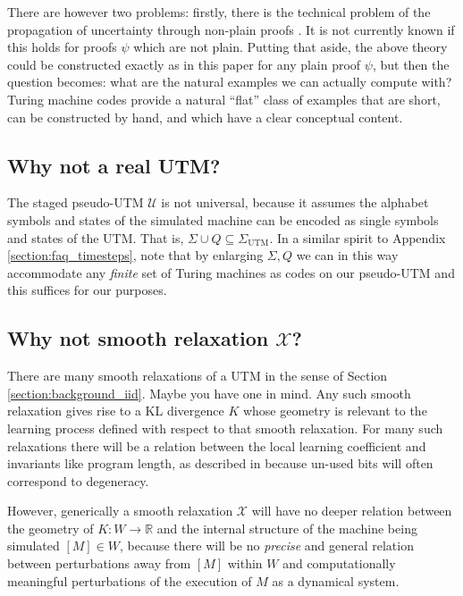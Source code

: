 \documentclass[english,letter paper,12pt,reqno]{article}
\theoremstyle{definition}
\newcommand{\lto}{\longrightarrow}
\begin{document}
There are however two problems: firstly, there is the technical problem of the propagation of uncertainty through non-plain proofs \cite{clift2020encodings}. It is not currently known if this holds for proofs $\psi$ which are not plain. Putting that aside, the above theory could be constructed exactly as in this paper for any plain proof $\psi$, but then the question becomes: what are the natural examples we can actually compute with? Turing machine codes provide a natural ``flat'' class of examples that are short, can be constructed by hand, and which have a clear conceptual content.

\subsection{Why not a real UTM?}\label{section:faq_realutm}

The staged pseudo-UTM $\mathcal{U}$ is not universal, because it assumes the alphabet symbols and states of the simulated machine can be encoded as single symbols and states of the UTM. That is, $\Sigma \cup Q \subseteq \Sigma_{\text{UTM}}$. In a similar spirit to Appendix \ref{section:faq_timesteps}, note that by enlarging $\Sigma, Q$ we can in this way accommodate any \emph{finite} set of Turing machines as codes on our pseudo-UTM and this suffices for our purposes.

\subsection{Why not smooth relaxation $\mathcal{X}$?}

There are many smooth relaxations of a UTM in the sense of Section \ref{section:background_iid}. Maybe you have one in mind. Any such smooth relaxation gives rise to a KL divergence $K$ whose geometry is relevant to the learning process defined with respect to that smooth relaxation. For many such relaxations there will be a relation between the local learning coefficient and invariants like program length, as described in \cite{clift2021geometry,waring2021geometric} because un-used bits will often correspond to degeneracy. 

However, generically a smooth relaxation $\mathcal{X}$ will have no deeper relation between the geometry of $K: W \lto \mathbb{R}$ and the internal structure of the machine being simulated $[M] \in W$, because there will be no \emph{precise} and general relation between perturbations away from $[M]$ within $W$ and computationally meaningful perturbations of the execution of $M$ as a dynamical system.
\end{document}
